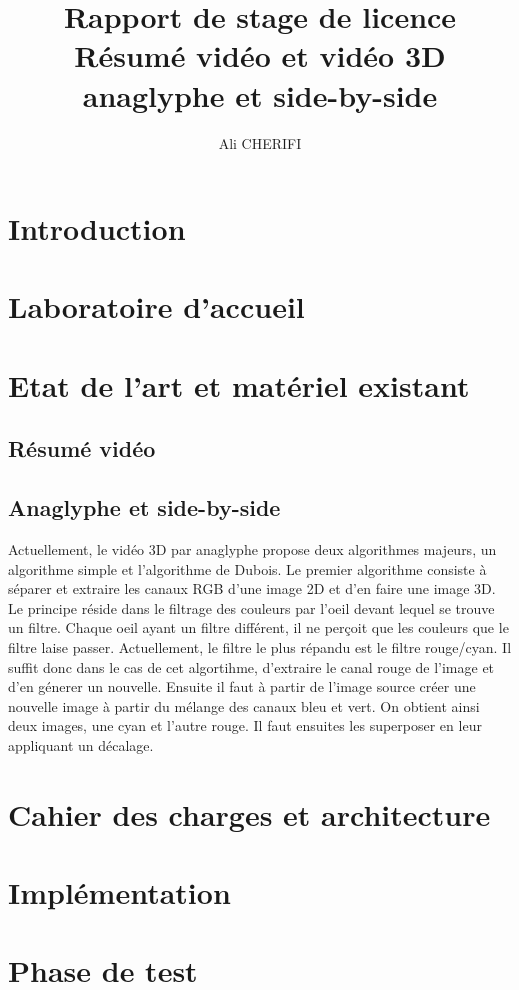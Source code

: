 \documentclass[10pt,a4paper]{article}
\author{Ali CHERIFI}
\title{Rapport de stage de licence\\Résumé vidéo et vidéo 3D anaglyphe et side-by-side}
\begin{document}
\maketitle
\newpage
\tableofcontents
\section{Introduction}

\section{Laboratoire d'accueil}



\section{Etat de l'art et matériel existant}
\subsection{Résumé vidéo}

\subsection{Anaglyphe et side-by-side}
Actuellement, le vidéo 3D par anaglyphe propose deux algorithmes majeurs, un algorithme simple et l'algorithme de Dubois.
Le premier algorithme consiste à séparer et extraire les canaux RGB d'une image 2D et d'en faire une image 3D. Le principe réside dans le filtrage des couleurs par l'oeil devant lequel se trouve un filtre.
Chaque oeil ayant un filtre différent, il ne perçoit que les couleurs que le filtre laise passer. Actuellement, le filtre le plus répandu est le filtre rouge/cyan.
Il suffit donc dans le cas de cet algortihme, d'extraire le canal rouge de l'image et d'en génerer un nouvelle. Ensuite il faut à partir de l'image source créer une nouvelle image à partir du mélange des canaux bleu et vert. On obtient ainsi deux images, une cyan et l'autre rouge. Il faut ensuites les superposer en leur appliquant un décalage.


\section{Cahier des charges et architecture}
\section{Implémentation}
\section{Phase de test}
\end{document}
